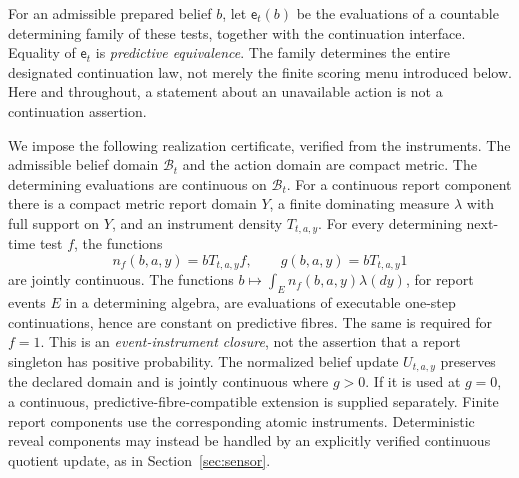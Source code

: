 For an admissible prepared belief $b$, let $\mathsf e_t(b)$ be the evaluations of a countable determining family of these tests, together with the continuation interface. Equality of $\mathsf e_t$ is \emph{predictive equivalence}. The family determines the entire designated continuation law, not merely the finite scoring menu introduced below. Here and throughout, a statement about an unavailable action is not a continuation assertion.

We impose the following realization certificate, verified from the instruments. The admissible belief domain $\mathcal B_t$ and the action domain are compact metric. The determining evaluations are continuous on $\mathcal B_t$. For a continuous report component there is a compact metric report domain $Y$, a finite dominating measure $\lambda$ with full support on $Y$, and an instrument density $T_{t,a,y}$. For every determining next-time test $f$, the functions
\begin{equation}\label{eq:density-pullback}
 n_f(b,a,y)=bT_{t,a,y}f,\qquad g(b,a,y)=bT_{t,a,y}1
\end{equation}
are jointly continuous. The functions $b\mapsto\int_E n_f(b,a,y)\lambda(dy)$, for report events $E$ in a determining algebra, are evaluations of executable one-step continuations, hence are constant on predictive fibres. The same is required for $f=1$. This is an \emph{event-instrument closure}, not the assertion that a report singleton has positive probability. The normalized belief update $U_{t,a,y}$ preserves the declared domain and is jointly continuous where $g>0$. If it is used at $g=0$, a continuous, predictive-fibre-compatible extension is supplied separately. Finite report components use the corresponding atomic instruments. Deterministic reveal components may instead be handled by an explicitly verified continuous quotient update, as in Section~\ref{sec:sensor}.

